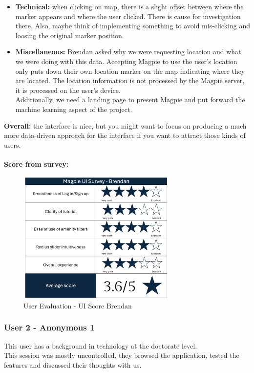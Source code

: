 \begin{itemize}
    \item \textbf{Technical: }when clicking on map, there is a slight offset between where the marker appears and where the user clicked. There is cause for investigation there. Also, maybe think of implementing something to avoid mis-clicking and loosing the original marker position.\\
    \item \textbf{Miscellaneous: }Brendan asked why we were requesting location and what we were doing with this data. Accepting Magpie to use the user's location only puts down their own location marker on the map indicating where they are located. The location information is not processed by the Magpie server, it is processed on the user's device.\\ Additionally, we need a landing page to present Magpie and put forward the machine learning aspect of the project.
\end{itemize}
\textbf{Overall: }the interface is nice, but you might want to focus on producing a much more data-driven approach for the interface if you want to attract those kinds of users.\\ \\
\newpage
\textbf{Score from survey: }
\begin{figure}[h!]
    \centering
    \includegraphics[width=0.7\textwidth]{images/survey-brendan.png}
    \caption{User Evaluation - UI Score Brendan}
\end{figure}

\newpage
\subsubsection{User 2 - Anonymous 1}
This user has a background in technology at the doctorate level.\\
This session was mostly uncontrolled, they browsed the application, tested the features and discussed their thoughts with us.\\

